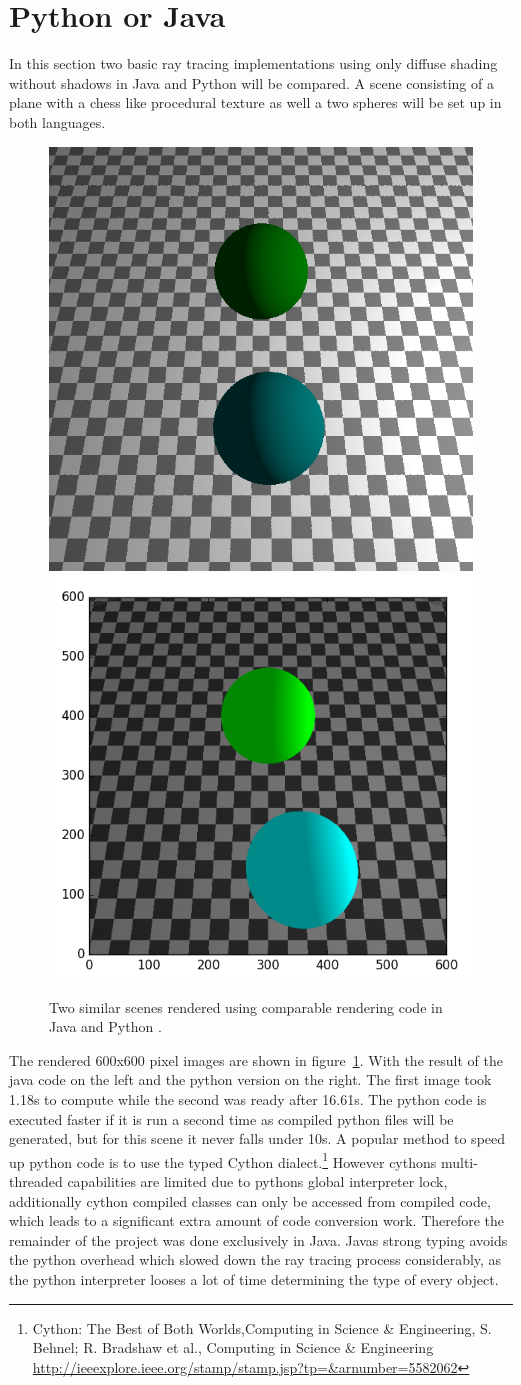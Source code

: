 \section{Python or Java}
In this section two basic ray tracing implementations using only diffuse shading without shadows in Java and Python will be compared. A scene consisting of a plane with a chess like procedural texture as well a two spheres will be set up in both languages. 
\begin{figure}
\centering
\includegraphics[width=0.35\linewidth]{./img/javaSphere2}
\includegraphics[width=0.40\linewidth]{./img/spherePython}
\caption{Two similar scenes rendered using comparable rendering code in Java and Python .}
\label{fig:spherePython}
\end{figure}
The rendered 600x600 pixel images are shown in figure~\ref{fig:spherePython}. With the result of the java code on the left and the python version on the right. The first image took 1.18s  to compute while the second was ready after 16.61s. The python code is executed faster if it is run a second time as compiled python files will be generated, but for this scene it never falls under 10s. A popular method to speed up python code is to use the typed Cython dialect.\footnote{Cython: The Best of Both Worlds,Computing in Science \& Engineering, S. Behnel; R. Bradshaw et al., Computing in Science \& Engineering \url{http://ieeexplore.ieee.org/stamp/stamp.jsp?tp=&arnumber=5582062}} However cythons multi-threaded capabilities are limited due to pythons global interpreter lock, additionally cython compiled classes can only be accessed from compiled code, which leads to a significant extra amount of code conversion work. Therefore the remainder of the project was done exclusively in Java. Javas strong typing avoids the python overhead which slowed down the ray tracing process considerably, as the python interpreter looses a lot of time determining the type of every object. 
